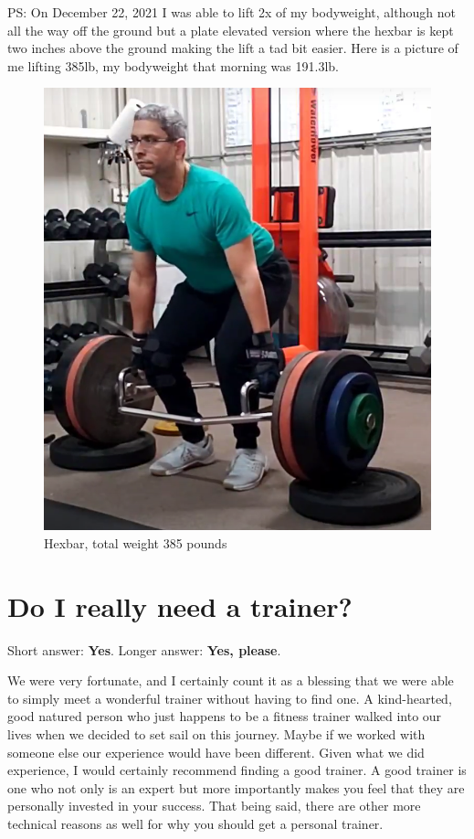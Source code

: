 \documentclass[
  oneside]{book}
\begin{document}
PS: On December 22, 2021 I was able to lift 2x of my bodyweight, although not all the way off the ground but a plate elevated version where the hexbar is kept two inches above the ground making the lift a tad bit easier. Here is a picture of me lifting 385lb, my bodyweight that morning was 191.3lb.

\begin{figure}
\centering
\includegraphics{pictures/385lb.png}
\caption{Hexbar, total weight 385 pounds}
\end{figure}

\hypertarget{do-i-really-need-a-trainer}{%
\section{Do I really need a trainer?}\label{do-i-really-need-a-trainer}}

Short answer: \textbf{Yes}. Longer answer: \textbf{Yes, please}.

We were very fortunate, and I certainly count it as a blessing that we were able to simply meet a wonderful trainer without having to find one. A kind-hearted, good natured person who just happens to be a fitness trainer walked into our lives when we decided to set sail on this journey. Maybe if we worked with someone else our experience would have been different. Given what we did experience, I would certainly recommend finding a good trainer. A good trainer is one who not only is an expert but more importantly makes you feel that they are personally invested in your success. That being said, there are other more technical reasons as well for why you should get a personal trainer.
\end{document}

